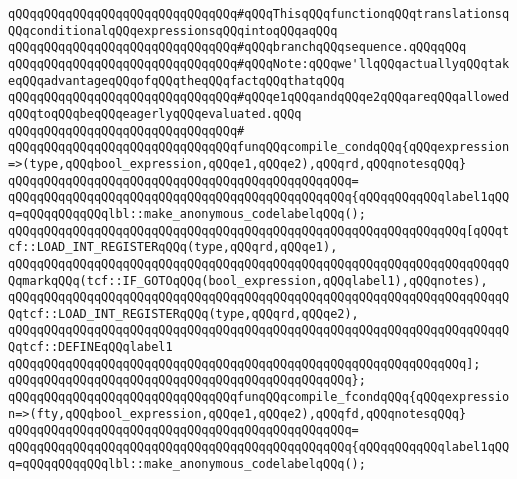 \verb|qQQqqQQqqQQqqQQqqQQqqQQqqQQqqQQq#qQQqThisqQQqfunctionqQQqtranslationsqQQqconditionalqQQqexpressionsqQQqintoqQQqaqQQq|\newline
\verb|qQQqqQQqqQQqqQQqqQQqqQQqqQQqqQQq#qQQqbranchqQQqsequence.qQQqqQQq|\newline
\verb|qQQqqQQqqQQqqQQqqQQqqQQqqQQqqQQq#qQQqNote:qQQqwe'llqQQqactuallyqQQqtakeqQQqadvantageqQQqofqQQqtheqQQqfactqQQqthatqQQq|\newline
\verb|qQQqqQQqqQQqqQQqqQQqqQQqqQQqqQQq#qQQqe1qQQqandqQQqe2qQQqareqQQqallowedqQQqtoqQQqbeqQQqeagerlyqQQqevaluated.qQQq|\newline
\verb|qQQqqQQqqQQqqQQqqQQqqQQqqQQqqQQq#|\newline
\verb|qQQqqQQqqQQqqQQqqQQqqQQqqQQqqQQqfunqQQqcompile_condqQQq{qQQqexpression=>(type,qQQqbool_expression,qQQqe1,qQQqe2),qQQqrd,qQQqnotesqQQq}|\newline
\verb|qQQqqQQqqQQqqQQqqQQqqQQqqQQqqQQqqQQqqQQqqQQqqQQq=|\newline
\verb|qQQqqQQqqQQqqQQqqQQqqQQqqQQqqQQqqQQqqQQqqQQqqQQq{qQQqqQQqqQQqlabel1qQQq=qQQqqQQqqQQqlbl::make_anonymous_codelabelqQQq();|\newline
\newline
\verb|qQQqqQQqqQQqqQQqqQQqqQQqqQQqqQQqqQQqqQQqqQQqqQQqqQQqqQQqqQQqqQQq[qQQqtcf::LOAD_INT_REGISTERqQQq(type,qQQqrd,qQQqe1),|\newline
\verb|qQQqqQQqqQQqqQQqqQQqqQQqqQQqqQQqqQQqqQQqqQQqqQQqqQQqqQQqqQQqqQQqqQQqqQQqmarkqQQq(tcf::IF_GOTOqQQq(bool_expression,qQQqlabel1),qQQqnotes),|\newline
\verb|qQQqqQQqqQQqqQQqqQQqqQQqqQQqqQQqqQQqqQQqqQQqqQQqqQQqqQQqqQQqqQQqqQQqqQQqtcf::LOAD_INT_REGISTERqQQq(type,qQQqrd,qQQqe2),|\newline
\verb|qQQqqQQqqQQqqQQqqQQqqQQqqQQqqQQqqQQqqQQqqQQqqQQqqQQqqQQqqQQqqQQqqQQqqQQqtcf::DEFINEqQQqlabel1|\newline
\verb|qQQqqQQqqQQqqQQqqQQqqQQqqQQqqQQqqQQqqQQqqQQqqQQqqQQqqQQqqQQqqQQq];|\newline
\verb|qQQqqQQqqQQqqQQqqQQqqQQqqQQqqQQqqQQqqQQqqQQqqQQq};|\newline
\newline
\verb|qQQqqQQqqQQqqQQqqQQqqQQqqQQqqQQqfunqQQqcompile_fcondqQQq{qQQqexpression=>(fty,qQQqbool_expression,qQQqe1,qQQqe2),qQQqfd,qQQqnotesqQQq}|\newline
\verb|qQQqqQQqqQQqqQQqqQQqqQQqqQQqqQQqqQQqqQQqqQQqqQQq=|\newline
\verb|qQQqqQQqqQQqqQQqqQQqqQQqqQQqqQQqqQQqqQQqqQQqqQQq{qQQqqQQqqQQqlabel1qQQq=qQQqqQQqqQQqlbl::make_anonymous_codelabelqQQq();|\newline
